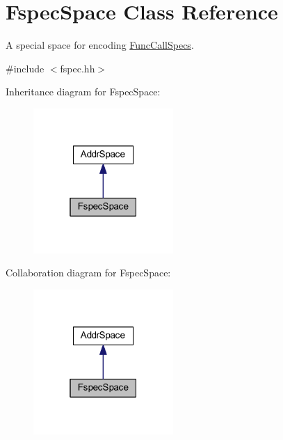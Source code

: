 \hypertarget{class_fspec_space}{}\section{Fspec\+Space Class Reference}
\label{class_fspec_space}


A special space for encoding \mbox{\hyperlink{class_func_call_specs}{Func\+Call\+Specs}}.  




{\ttfamily \#include $<$fspec.\+hh$>$}



Inheritance diagram for Fspec\+Space\+:
\nopagebreak
\begin{figure}[H]
\begin{center}
\leavevmode
\includegraphics[width=151pt]{class_fspec_space__inherit__graph}
\end{center}
\end{figure}


Collaboration diagram for Fspec\+Space\+:
\nopagebreak
\begin{figure}[H]
\begin{center}
\leavevmode
\includegraphics[width=151pt]{class_fspec_space__coll__graph}
\end{center}
\end{figure}
